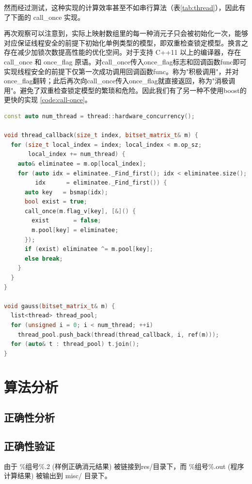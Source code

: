 \documentclass[a4paper]{article}
\begin{document}
然而经过测试，这种实现的计算效率甚至不如串行算法（表\ref{tab:thread}），因此有了下面的 call\_once 实现。

再次观察可以注意到，实际上映射数组里的每一种消元子只会被初始化一次，能够对应保证线程安全的前提下初始化单例类型的模型，即双重检查锁定模型。换言之存在减少加锁次数提高性能的优化空间。对于支持 C++11 以上的编译器，存在 call\_once 和 once\_flag 原语。对call\_once传入once\_flag标志和回调函数func即可实现线程安全的前提下仅第一次成功调用回调函数func。称为"积极调用"，并对once\_flag翻转；此后再次向call\_once传入once\_flag就直接返回，称为"消极调用"。避免了双重检查锁定模型的繁琐和危险。因此我们有了另一种不使用boost的更快的实现 \ref{code:call-once}。

\begin{lstlisting}[frame=trbl, language={C++}, caption={call\_once 位元矩阵消元部分}, label={code:call-once}]
const auto num_thread = thread::hardware_concurrency();

void thread_callback(size_t index, bitset_matrix_t& m) {
  for (size_t local_index = index; local_index < m.op_sz;
       local_index += num_thread) {
    auto& eliminatee = m.op[local_index];
    for (auto idx = eliminatee._Find_first(); idx < eliminatee.size();
         idx      = eliminatee._Find_first()) {
      auto key   = bsmap(idx);
      bool exist = true;
      call_once(m.flag_v[key], [&]() {
        exist       = false;
        m.pool[key] = eliminatee;
      });
      if (exist) eliminatee ^= m.pool[key];
      else break;
    }
  }
}

void gauss(bitset_matrix_t& m) {
  list<thread> thread_pool;
  for (unsigned i = 0; i < num_thread; ++i)
    thread_pool.push_back(thread(thread_callback, i, ref(m)));
  for (auto& t : thread_pool) t.join();
}
\end{lstlisting}

\section{算法分析}
\subsection{正确性分析}

\subsection{正确性验证}
由于 \%组号\%.2 (样例正确消元结果) 被链接到res/目录下，而 \%组号\%.out (程序计算结果) 被输出到 misc/ 目录下。
\end{document}
